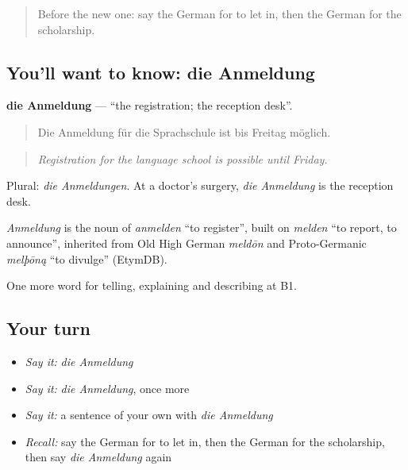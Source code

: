 \begin{quote}
Before the new one: say the German for to let in, then the German for the scholarship.
\end{quote}

\subsection*{You'll want to know: die Anmeldung}
\textbf{die Anmeldung} — \textquotedblleft{}the registration; the reception desk\textquotedblright{}.

\begin{quote}
Die Anmeldung für die Sprachschule ist bis Freitag möglich.
\end{quote}

\begin{quote}
\emph{Registration for the language school is possible until Friday.}
\end{quote}

Plural: \emph{die Anmeldungen}. At a doctor's surgery, \emph{die Anmeldung} is the reception desk.

\begin{cousinweb}
\emph{Anmeldung} is the noun of \emph{anmelden} \textquotedblleft{}to register\textquotedblright{}, built on \emph{melden} \textquotedblleft{}to report, to announce\textquotedblright{}, inherited from Old High German \emph{meldōn} and Proto-Germanic \emph{melþōną} \textquotedblleft{}to divulge\textquotedblright{} (EtymDB).
\end{cousinweb}

\begin{grammarlens}[title={What you've built}]
One more word for telling, explaining and describing at B1.
\end{grammarlens}

\subsection*{Your turn}
\begin{itemize}
\raggedright
  \item \emph{Say it:} \emph{die Anmeldung}
  \item \emph{Say it:} \emph{die Anmeldung}, once more
  \item \emph{Say it:} a sentence of your own with \emph{die Anmeldung}
  \item \emph{Recall:} say the German for to let in, then the German for the scholarship, then say \emph{die Anmeldung} again
\end{itemize}

